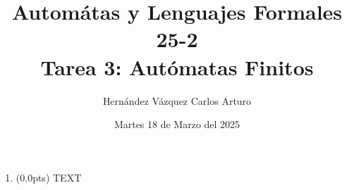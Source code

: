 \documentclass{article}
\title{Automátas y Lenguajes Formales 25-2 \\ Tarea 3: Autómatas Finitos}
\author{Hernández Vázquez Carlos Arturo }
\date{Martes 18 de Marzo del 2025}
\begin{document}
\maketitle

\begin{enumerate}
    \item (0.0pts) TEXT
\end{enumerate}
\end{document}
